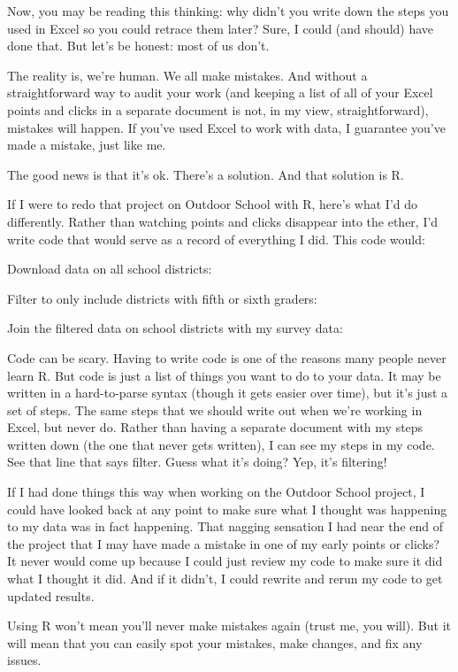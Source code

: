\documentclass[
]{book}
\begin{document}
Now, you may be reading this thinking: why didn't you write down the steps you used in Excel so you could retrace them later? Sure, I could (and should) have done that. But let's be honest: most of us don't.

The reality is, we're human. We all make mistakes. And without a straightforward way to audit your work (and keeping a list of all of your Excel points and clicks in a separate document is not, in my view, straightforward), mistakes will happen. If you've used Excel to work with data, I guarantee you've made a mistake, just like me.

The good news is that it's ok. There's a solution. And that solution is R.

If I were to redo that project on Outdoor School with R, here's what I'd do differently. Rather than watching points and clicks disappear into the ether, I'd write code that would serve as a record of everything I did. This code would:

Download data on all school districts:

Filter to only include districts with fifth or sixth graders:

Join the filtered data on school districts with my survey data:

Code can be scary. Having to write code is one of the reasons many people never learn R. But code is just a list of things you want to do to your data. It may be written in a hard-to-parse syntax (though it gets easier over time), but it's just a set of steps. The same steps that we should write out when we're working in Excel, but never do. Rather than having a separate document with my steps written down (the one that never gets written), I can see my steps in my code. See that line that says filter. Guess what it's doing? Yep, it's filtering!

If I had done things this way when working on the Outdoor School project, I could have looked back at any point to make sure what I thought was happening to my data was in fact happening. That nagging sensation I had near the end of the project that I may have made a mistake in one of my early points or clicks? It never would come up because I could just review my code to make sure it did what I thought it did. And if it didn't, I could rewrite and rerun my code to get updated results.

Using R won't mean you'll never make mistakes again (trust me, you will). But it will mean that you can easily spot your mistakes, make changes, and fix any issues.
\end{document}
